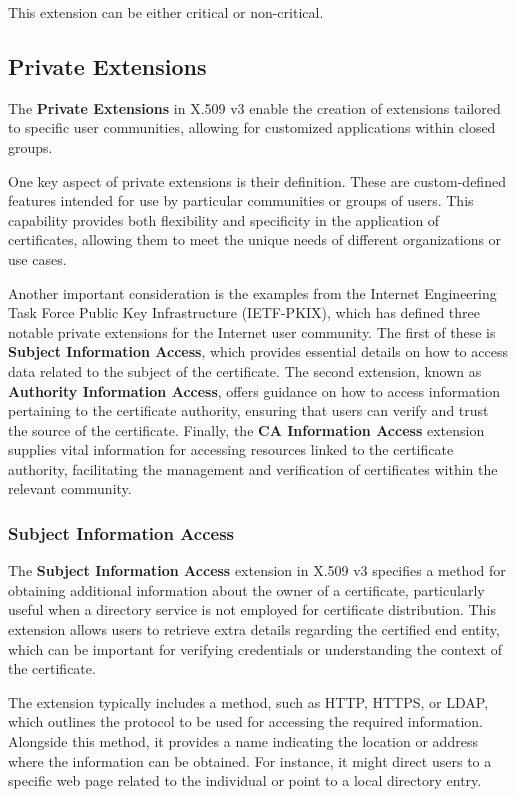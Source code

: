 This extension can be either critical or non-critical.

\subsection{Private Extensions}

The \textbf{Private Extensions} in X.509 v3 enable the creation of 
extensions tailored to specific user communities, allowing for 
customized applications within closed groups. 

One key aspect of private extensions is their definition. These are 
custom-defined features intended for use by particular communities 
or groups of users. This capability provides both flexibility and 
specificity in the application of certificates, allowing them to 
meet the unique needs of different organizations or use cases.

Another important consideration is the examples from the Internet 
Engineering Task Force Public Key Infrastructure (IETF-PKIX), which 
has defined three notable private extensions for the Internet user 
community. The first of these is \textbf{Subject Information Access}, 
which provides essential details on how to access data related to 
the subject of the certificate. The second extension, known as 
\textbf{Authority Information Access}, offers guidance on how to 
access information pertaining to the certificate authority, ensuring 
that users can verify and trust the source of the certificate. 
Finally, the \textbf{CA Information Access} extension supplies vital 
information for accessing resources linked to the certificate 
authority, facilitating the management and verification of 
certificates within the relevant community.
\subsubsection{Subject Information Access}

The \textbf{Subject Information Access} extension in X.509 v3 
specifies a method for obtaining additional information about the 
owner of a certificate, particularly useful when a directory 
service is not employed for certificate distribution. This 
extension allows users to retrieve extra details regarding the 
certified end entity, which can be important for verifying 
credentials or understanding the context of the certificate.

The extension typically includes a method, such as HTTP, HTTPS, 
or LDAP, which outlines the protocol to be used for accessing 
the required information. Alongside this method, it provides a 
name indicating the location or address where the information 
can be obtained. For instance, it might direct users to a 
specific web page related to the individual or point to a 
local directory entry.

